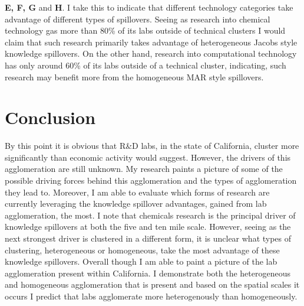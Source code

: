 \documentclass[12pt,letterpaper]{article}
\begin{document}
\textbf{E, F, G} and \textbf{H}. I take this to indicate that different technology categories take advantage of different types of spillovers. Seeing as research into chemical technology gas more than 80\% of its labs outside of technical clusters I would claim that such research primarily takes advantage of heterogeneous Jacobs style knowledge spillovers. On the other hand, research into computational technology has only around 60\% of its labs outside of a technical cluster, indicating, such research may benefit more from the homogeneous MAR style spillovers. 

\section{Conclusion}
By this point it is obvious that R\&D labs, in the state of California, cluster more significantly than economic activity would suggest. However, the drivers of this agglomeration are still unknown. My research paints a picture of some of the possible driving forces behind this agglomeration and the types of agglomeration they lead to. Moreover, I am able to evaluate which forms of research are currently leveraging the knowledge spillover advantages, gained from lab agglomeration, the most. I note that chemicals research is the principal driver of knowledge spillovers at both the five and ten mile scale. However, seeing as the next strongest driver is clustered in a different form, it is unclear what types of clustering, heterogeneous or homogeneous, take the most advantage of these knowledge spillovers. Overall though I am able to paint a picture of the lab agglomeration present within California. I demonstrate both the heterogeneous and homogeneous agglomeration that is present and based on the spatial scales it occurs I predict that labs agglomerate more heterogenously than homogeneously. 

\newpage
\end{document}
